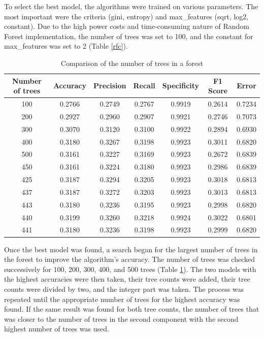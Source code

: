 \documentclass[
onecolumn,
]{ceurart}
\begin{document}
	To select the best model, the algorithms were trained on various parameters. The most important were the criteria (gini, entropy) and max\_features (sqrt, log2, constant). Due to the high power costs and time-consuming nature of Random Forest implementation, the number of trees was set to 100, and the constant for max\_features was set to 2 (Table \ref{rfc}).
	\begin{table}[htbp]
		\centering
		\caption{Comparison of the number of trees in a forest}
		\begin{tabular}{|c|c|c|c|c|c|c|}
			\hline
			Number of trees & Accuracy & Precision & Recall & Specificity & F1 Score & Error \\\hline
			100 & 0.2766 & 0.2749 & 0.2767 & 0.9919 & 0.2614 & 0.7234 \\\hline
			200 & 0.2927 & 0.2960 & 0.2907 & 0.9921 & 0.2746 & 0.7073 \\\hline
			300 & 0.3070 & 0.3120 & 0.3100 & 0.9922 & 0.2894 & 0.6930 \\\hline
			400 & 0.3180 & 0.3267 & 0.3198 & 0.9923 & 0.3011 & 0.6820 \\\hline
			500 & 0.3161 & 0.3227 & 0.3169 & 0.9923 & 0.2672 & 0.6839 \\\hline
			450 & 0.3161 & 0.3224 & 0.3180 & 0.9923 & 0.2986 & 0.6839 \\\hline
			425 & 0.3187 & 0.3294 & 0.3205 & 0.9923 & 0.3018 & 0.6813 \\\hline
			437 & 0.3187 & 0.3272 & 0.3203 & 0.9923 & 0.3013 & 0.6813 \\\hline
			443 & 0.3180 & 0.3236 & 0.3195 & 0.9923 & 0.2998 & 0.6820 \\\hline
			440 & 0.3199 & 0.3260 & 0.3218 & 0.9924 & 0.3022 & 0.6801 \\\hline
			441 & 0.3180 & 0.3236 & 0.3198 & 0.9923 & 0.2999 & 0.6820 \\\hline
		\end{tabular}
		\label{rft}
	\end{table}
	
	
	Once the best model was found, a search began for the largest number of trees in the forest to improve the algorithm's accuracy. The number of trees was checked successively for 100, 200, 300, 400, and 500 trees (Table \ref{rft}). The two models with the highest accuracies were then taken, their tree counts were added, their tree counts were divided by two, and the integer part was taken. The process was repeated until the appropriate number of trees for the highest accuracy was found. If the same result was found for both tree counts, the number of trees that was closer to the number of trees in the second component with the second highest number of trees was used.
	
\end{document}
